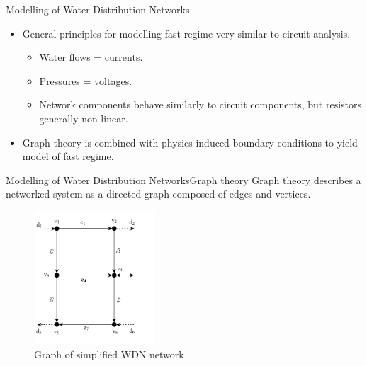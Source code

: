 
\begin{frame}{Modelling of Water Distribution Networks}
	\begin{itemize}
		\item General principles for modelling fast regime very similar to circuit analysis.
		\begin{itemize}
			\item Water flows = currents.
			\item Pressures = voltages.
			\item Network components behave similarly to circuit components, but resistors generally non-linear.
		\end{itemize}
		\item Graph theory is combined with physics-induced boundary conditions to yield model of fast regime.
	\end{itemize}
\end{frame}



\begin{frame}{Modelling of Water Distribution Networks}{Graph theory}
	Graph theory describes a networked system as a directed graph composed of edges and vertices.
	
	\begin{figure}[h!]
		\centering
		\includegraphics[width=0.4\textwidth]{Topics/SystemModel/Graphics/Graph.png}
		\caption{Graph of simplified WDN network }
		\label{fig:graph}
	\end{figure}
	

\end{frame}


